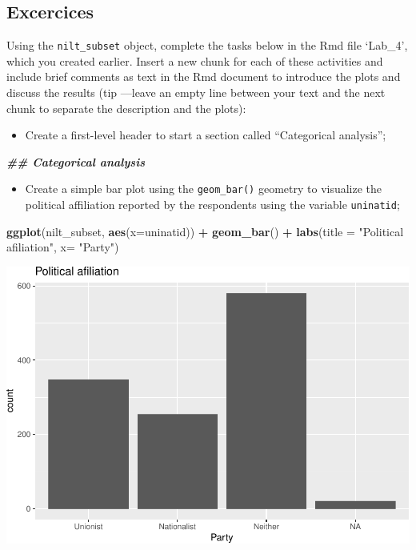 \documentclass[
]{book}
\newenvironment{Shaded}{\begin{snugshade}}{\end{snugshade}}
\newcommand{\AttributeTok}[1]{\textcolor[rgb]{0.13,0.29,0.53}{#1}}
\newcommand{\DocumentationTok}[1]{\textcolor[rgb]{0.56,0.35,0.01}{\textbf{\textit{#1}}}}
\newcommand{\FunctionTok}[1]{\textcolor[rgb]{0.13,0.29,0.53}{\textbf{#1}}}
\newcommand{\NormalTok}[1]{#1}
\newcommand{\SpecialCharTok}[1]{\textcolor[rgb]{0.81,0.36,0.00}{\textbf{#1}}}
\newcommand{\StringTok}[1]{\textcolor[rgb]{0.31,0.60,0.02}{#1}}
\providecommand{\tightlist}{%
  \setlength{\itemsep}{0pt}\setlength{\parskip}{0pt}}
\begin{document}
\hypertarget{excercices}{%
\subsection{Excercices}\label{excercices}}

Using the \texttt{nilt\_subset} object, complete the tasks below in the Rmd file `Lab\_4', which you created earlier. Insert a new chunk for each of these activities and include brief comments as text in the Rmd document to introduce the plots and discuss the results (tip ---leave an empty line between your text and the next chunk to separate the description and the plots):

\begin{itemize}
\tightlist
\item
  Create a first-level header to start a section called ``Categorical analysis'';
\end{itemize}

\begin{Shaded}
\begin{Highlighting}[]
\DocumentationTok{\#\# Categorical analysis}
\end{Highlighting}
\end{Shaded}

\begin{itemize}
\tightlist
\item
  Create a simple bar plot using the \texttt{geom\_bar()} geometry to visualize the political affiliation reported by the respondents using the variable \texttt{uninatid};
\end{itemize}

\begin{Shaded}
\begin{Highlighting}[]
\FunctionTok{ggplot}\NormalTok{(nilt\_subset, }\FunctionTok{aes}\NormalTok{(}\AttributeTok{x=}\NormalTok{uninatid)) }\SpecialCharTok{+}
  \FunctionTok{geom\_bar}\NormalTok{() }\SpecialCharTok{+}
  \FunctionTok{labs}\NormalTok{(}\AttributeTok{title =} \StringTok{"Political afiliation"}\NormalTok{, }\AttributeTok{x=} \StringTok{"Party"}\NormalTok{)}
\end{Highlighting}
\end{Shaded}

\begin{flushleft}\includegraphics[width=1\linewidth]{lab-workbook_files/figure-latex/unnamed-chunk-127-1} \end{flushleft}
\end{document}
